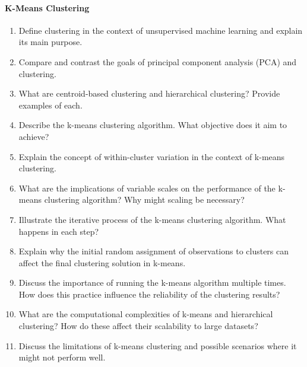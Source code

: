 \paragraph*{K-Means Clustering}
\begin{enumerate}
    \item Define clustering in the context of unsupervised machine learning and explain its main purpose.
    \item Compare and contrast the goals of principal component analysis (PCA) and clustering.
    \item What are centroid-based clustering and hierarchical clustering? Provide examples of each.
    \item Describe the k-means clustering algorithm. What objective does it aim to achieve?
    \item Explain the concept of within-cluster variation in the context of k-means clustering.
    \item What are the implications of variable scales on the performance of the k-means clustering algorithm? Why might scaling be necessary?
    \item Illustrate the iterative process of the k-means clustering algorithm. What happens in each step?
    \item Explain why the initial random assignment of observations to clusters can affect the final clustering solution in k-means.
    \item Discuss the importance of running the k-means algorithm multiple times. How does this practice influence the reliability of the clustering results?
    \item What are the computational complexities of k-means and hierarchical clustering? How do these affect their scalability to large datasets?
    \item Discuss the limitations of k-means clustering and possible scenarios where it might not perform well.
\end{enumerate}
